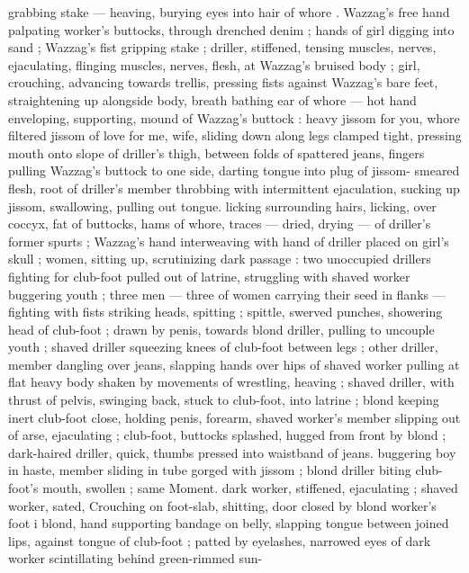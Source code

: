 grabbing stake --- heaving, burying eyes into hair of whore . 
Wazzag's free hand palpating worker's buttocks, through drenched 
denim ; hands of girl digging into sand ; Wazzag's fist gripping stake 
; driller, stiffened, tensing muscles, nerves, ejaculating, flinging 
muscles, nerves, flesh, at Wazzag's bruised body ; girl, crouching, 
advancing towards trellis, pressing fists against Wazzag's bare feet, 
straightening up alongside body, breath bathing ear of whore --- hot 
hand enveloping, supporting, mound of Wazzag's buttock : {\gl}{\thd} heavy 
jissom for you, whore{\thd} filtered jissom of love for me, wife{\thd}{\gr}, sliding 
down along legs clamped tight, pressing mouth onto slope of 
driller's thigh, between folds of spattered jeans, fingers pulling 
Wazzag's buttock to one side, darting tongue into plug of jissom- 
smeared flesh, root of driller's member throbbing with intermittent 
ejaculation, sucking up jissom, swallowing, pulling out tongue. licking 
surrounding hairs, licking, over coccyx, fat of buttocks, hams of 
whore, traces --- dried, drying --- of driller's former spurts ; 
Wazzag's hand interweaving with hand of driller placed on girl's skull 
; women, sitting up, scrutinizing dark passage : two unoccupied 
drillers fighting for club-foot pulled out of latrine, struggling with 
shaved worker buggering youth ; three men --- three of women 
carrying their seed in flanks --- fighting with fists striking heads, 
spitting ; spittle, swerved punches, showering head of club-foot ; 
drawn by penis, towards blond driller, pulling to uncouple youth ; 
shaved driller squeezing knees of club-foot between legs ; other 
driller, member dangling over jeans, slapping hands over hips of 
shaved worker pulling at flat heavy body shaken by movements of 
wrestling, heaving ; shaved driller, with thrust of pelvis, swinging 
back, stuck to club-foot, into latrine ; blond keeping inert club-foot 
close, holding penis, forearm, shaved worker's member slipping out 
of arse, ejaculating ; club-foot, buttocks splashed, hugged from front 
by blond ; dark-haired driller, quick, thumbs pressed into waistband 
of jeans. buggering boy in haste, member sliding in tube gorged with 
jissom ; blond driller biting club-foot's mouth, swollen ; same 
Moment. dark worker, stiffened, ejaculating ; shaved worker, sated, 
Crouching on foot-slab, shitting, door closed by blond worker's foot 
i blond, hand supporting bandage on belly, slapping tongue between 
joined lips, against tongue of club-foot ; patted by eyelashes, 
narrowed eyes of dark worker scintillating behind green-rimmed sun- 
